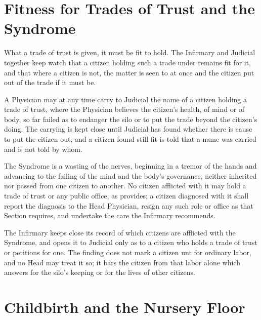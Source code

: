 \section{Fitness for Trades of Trust and the Syndrome}
\label{sec:health:fitness-for-trades-of-trust-and-the-syndrome}

What a trade of trust is given, it must be fit to hold. The Infirmary and Judicial together keep watch that a citizen holding such a trade under  remains fit for it, and that where a citizen is not, the matter is seen to at once and the citizen put out of the trade if it must be.

\begin{clauses}
\item A Physician may at any time carry to Judicial the name of a citizen holding a trade of trust, where the Physician believes the citizen's health, of mind or of body, so far failed as to endanger the silo or to put the trade beyond the citizen's doing. The carrying is kept close until Judicial has found whether there is cause to put the citizen out, and a citizen found still fit is told that a name was carried and is not told by whom.
\item The Syndrome is a wasting of the nerves, beginning in a tremor of the hands and advancing to the failing of the mind and the body's governance, neither inherited nor passed from one citizen to another. No citizen afflicted with it may hold a trade of trust or any public office, as  provides; a citizen diagnosed with it shall report the diagnosis to the Head Physician, resign any such role or office as that Section requires, and undertake the care the Infirmary recommends.
\item The Infirmary keeps close its record of which citizens are afflicted with the Syndrome, and opens it to Judicial only as to a citizen who holds a trade of trust or petitions for one. The finding does not mark a citizen unt for ordinary labor, and no Head may treat it so; it bars the citizen from that labor alone which answers for the silo's keeping or for the lives of other citizens.
\end{clauses}

\section{Childbirth and the Nursery Floor}
\label{sec:health:childbirth-and-the-nursery-floor}

